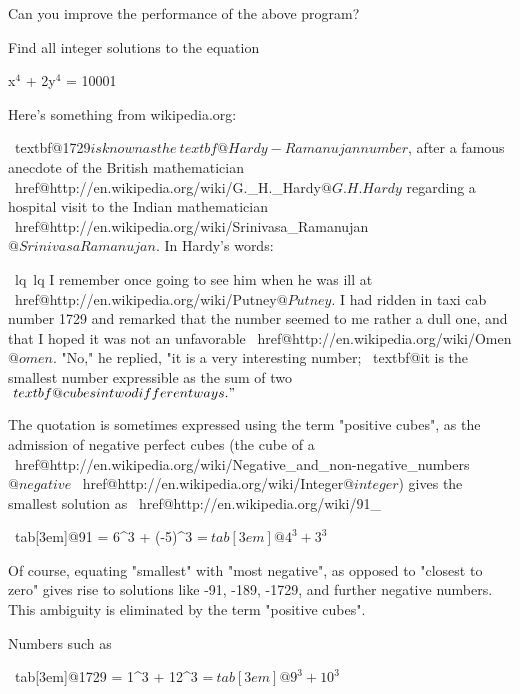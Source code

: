 \begin{console}
\begin{console}
\begin{ex}
Can you improve the performance of the above program?
\end{ex}
\begin{ex}
Find all integer solutions to the equation
\begin{center}
x$^{4}$ + 2y$^{4}$ = 10001
\end{center}
\end{ex}
\begin{ex}
Here's something from wikipedia.org:
\begin{console}[commandchars=\~\@\$]
~textbf@1729$ is known as the ~textbf@Hardy-Ramanujan number$, after a
famous anecdote of the British mathematician
~href@http://en.wikipedia.org/wiki/G._H._Hardy$@G. H. Hardy$ regarding a
hospital visit to the Indian mathematician
~href@http://en.wikipedia.org/wiki/Srinivasa_Ramanujan$@Srinivasa
Ramanujan$. In Hardy's words:

~lq~lq I remember once going to see him when he was ill at
~href@http://en.wikipedia.org/wiki/Putney$@Putney$. I had ridden in taxi cab number 1729
and remarked that the number seemed to me rather a dull
one, and that I hoped it was not an unfavorable ~href@http://en.wikipedia.org/wiki/Omen$@omen$.
"No," he replied, "it is a very interesting number;
~textbf@it is the smallest number expressible as the sum of two$
~textbf@cubes in two different ways."$

The quotation is sometimes expressed using the
term "positive cubes", as the admission of negative
perfect cubes (the cube of a ~href@http://en.wikipedia.org/wiki/Negative_and_non-negative_numbers$@negative$ ~href@http://en.wikipedia.org/wiki/Integer$@integer$) gives
the smallest solution as ~href@http://en.wikipedia.org/wiki/91_%

~tab[3em]@91 = 6^3 + (-5)^3 =$
~tab[3em]@4^3 + 3^3$

Of course, equating "smallest" with "most negative", as
opposed to "closest to zero" gives rise to solutions
like -91, -189, -1729, and further negative numbers.
This ambiguity is eliminated by the term "positive cubes".

Numbers such as

~tab[3em]@1729 = 1^3 + 12^3 =$
~tab[3em]@9^3 + 10^3$


\end{console}
\end{ex}
\end{console}
\end{console}
